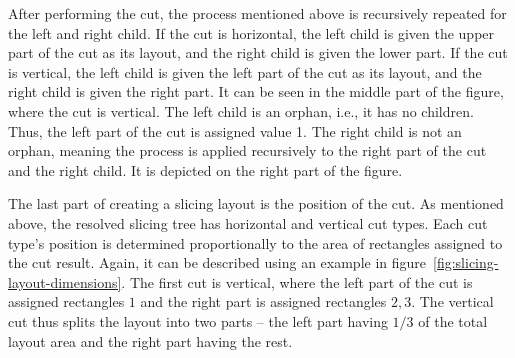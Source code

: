 After performing the cut, the process mentioned above is recursively repeated
for the left and right child.
If the cut is horizontal, the left child is given the upper part of the cut as its layout, and the right child is given the lower part.
If the cut is vertical, the left child is given the left part of the cut as its layout, and the right child is given the right part.
It can be seen in the middle part of the figure, where the cut is vertical.
The left child is an orphan, i.e., it has no children.
Thus, the left part of the cut is assigned value 1.
The right child is not an orphan, meaning the process is applied recursively to the right part of the cut and the right child.
It is depicted on the right part of the figure.

The last part of creating a slicing layout is the position of the cut.
As mentioned above, the resolved slicing tree has horizontal and vertical cut types.
Each cut type's position is determined proportionally to the area of rectangles assigned to the cut result.
Again, it can be described using an example in figure~\ref{fig:slicing-layout-dimensions}.
The first cut is vertical, where the left part of the cut is assigned rectangles $1$ and the right part is assigned rectangles $2,3$.
The vertical cut thus splits the layout into two parts – the left part having $1/3$ of the total layout area and the right part
having the rest.




